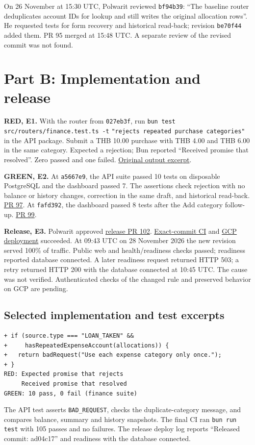 \documentclass[11pt,a4paper]{article}
\newcommand{\gh}[2]{\href{https://github.com/CPE334-Pockit/Pockit/#1}{#2}}
\begin{document}
On 26 November at 15:30 UTC, Polwarit reviewed \texttt{bf94b39}: ``The baseline router deduplicates account IDs for lookup and still writes the original allocation rows''. He requested tests for form recovery and historical read-back; revision \texttt{be70f44} added them. PR 95 merged at 15:48 UTC. A separate review of the revised commit was not found.

\section{Part B: Implementation and release}
\textbf{RED, E1.} With the router from \texttt{027eb3f}, run \texttt{bun test src/routers/finance.test.ts -t} \texttt{"rejects repeated purchase categories"} in the API package. Submit a THB 10.00 purchase with THB 4.00 and THB 6.00 in the same category. Expected a rejection; Bun reported ``Received promise that resolved''. Zero passed and one failed. \gh{issues/80\#issuecomment-7214459248}{Original output excerpt}.

\textbf{GREEN, E2.} At \texttt{a5667e9}, the API suite passed 10 tests on disposable PostgreSQL and the dashboard passed 7. The assertions check rejection with no balance or history changes, correction in the same draft, and historical read-back. \gh{pull/97}{PR 97}. At \texttt{fafd392}, the dashboard passed 8 tests after the Add category follow-up. \gh{pull/99}{PR 99}.

\textbf{Release, E3.} Polwarit approved \gh{pull/102}{release PR 102}. \gh{actions/runs/46131190313}{Exact-commit CI} and \gh{actions/runs/46131190356}{GCP deployment} succeeded. At 09:43 UTC on 28 November 2026 the new revision served 100\% of traffic. Public web and health/readiness checks passed; readiness reported database connected. A later readiness request returned HTTP 503; a retry returned HTTP 200 with the database connected at 10:45 UTC. The cause was not verified. Authenticated checks of the changed rule and preserved behavior on GCP are pending.
\subsection{Selected implementation and test excerpts}
\begin{verbatim}
+ if (source.type === "LOAN_TAKEN" &&
+     hasRepeatedExpenseAccount(allocations)) {
+   return badRequest("Use each expense category only once.");
+ }
RED: Expected promise that rejects
     Received promise that resolved
GREEN: 10 pass, 0 fail (finance suite)
\end{verbatim}
The API test asserts \texttt{BAD\_REQUEST}, checks the duplicate-category message, and compares balance, summary and history snapshots. The final CI ran \texttt{bun run test} with 105 passes and no failures. The release deploy log reports ``Released commit: ad04c17'' and readiness with the database connected.
\end{document}
